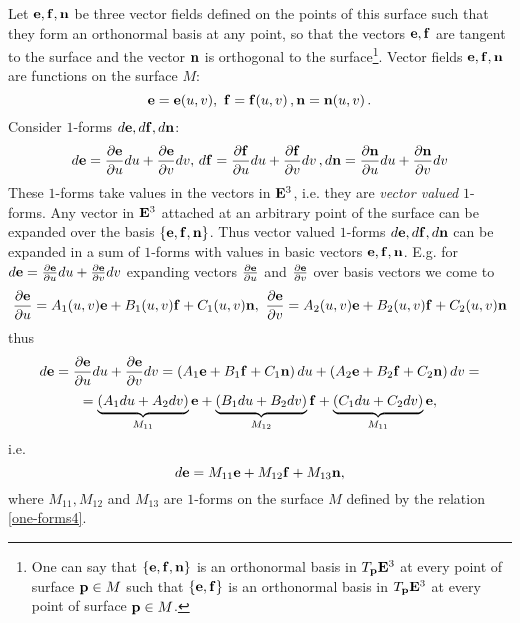 \documentclass[12pt]{article}
\theoremstyle{theorem}
\numberwithin{equation}{section}
\begin{document}
{   Let ${{\bf e},{\bf f},{\bf n}}$ be three vector fields defined on the points of this surface
   such that they form an orthonormal basis at any point, so that the vectors ${\bf e},{\bf f}$ are tangent to the surface
   and  the vector ${\bf n}$ is orthogonal to the surface\footnote{
   One can say that $\{{\bf e},{\bf f},{\bf n}\}$ is an orthonormal basis in $T_{{\bf p}}{\bf E}^3$ at every point of surface  ${\bf p}\in M$
such that $\{{\bf e},{\bf f}\}$ is an orthonormal basis in $T_{{\bf p}}{\bf E}^3$ at every point of surface  ${\bf p}\in M$.}.
   Vector fields ${\bf e},{\bf f},{\bf n}$ are functions on the surface $M$:
                   $$
          {\bf e}={\bf e}(u,v),\,\, {\bf f}={\bf f}(u,v)\,, {\bf n}={\bf n}(u,v)\,.
                   $$
 Consider $1$-forms $d{\bf e},d{\bf f},d{\bf n}$:
              $$
       d{\bf e}={\partial {\bf e}\over \partial u}du+{\partial {\bf e}\over \partial v}dv,\,
       d{\bf f}={\partial {\bf f}\over \partial u}du+{\partial {\bf f}\over \partial v}dv\,,
       d{\bf n}={\partial {\bf n}\over \partial u}du+{\partial {\bf n}\over \partial v}dv
              $$
 These $1$-forms take values in the vectors in ${\bf E}^3$, i.e. they are {\it vector valued} $1$-forms.
 Any vector in ${\bf E}^3$ attached at an arbitrary point of the surface
 can be expanded over the basis  $\{{\bf e},{\bf f},{\bf n}\}$. Thus vector valued $1$-forms $d{\bf e},d{\bf f},d{\bf n}$ can be expanded
 in a sum of $1$-forms with values in basic vectors  ${\bf e},{\bf f},{\bf n}$. E.g.
 for $d{\bf e}={\partial {\bf e}\over \partial u}du+{\partial {\bf e}\over \partial v}dv$ expanding   vectors
 ${\partial {\bf e}\over \partial u}$ and ${\partial {\bf e}\over \partial v}$ over basis vectors we come to
            $$
      {\partial {\bf e}\over \partial u}=A_1(u,v){\bf e}+B_1(u,v){\bf f}+C_1(u,v){\bf n},\,\,
      {\partial {\bf e}\over \partial v}=A_2(u,v){\bf e}+B_2(u,v){\bf f}+C_2(u,v){\bf n}
            $$
 thus
          $$
   d{\bf e}={\partial {\bf e}\over \partial u}du+{\partial {\bf e}\over \partial v}dv=\left(A_1{\bf e}+B_1{\bf f}+C_1{\bf n}\right)du+\left(A_2{\bf e}+B_2{\bf f}+C_2{\bf n}\right)dv=
          $$
           \begin{equation}\label{one-forms4}
 =\underbrace{(A_1du+A_2dv)}_{M_{11}}{\bf e}+
 \underbrace{(B_1du+B_2dv)}_{M_{12}}{\bf f}+\underbrace{(C_1du+C_2dv)}_{M_{11}}{\bf e},
           \end{equation}
 i.e.
            $$
       d{\bf e}=M_{11}{\bf e}+M_{12}{\bf f}+M_{13}{\bf n},
            $$
where $M_{11}, M_{12}$ and $M_{13}$ are $1$-forms on the surface $M$ defined by the relation \eqref{one-forms4}.

}
\end{document}
